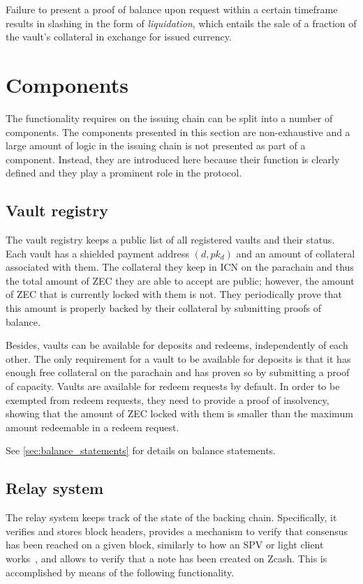 Failure to present a proof of balance upon request within a certain timeframe results in slashing in the form of \emph{liquidation}, which entails the sale of a fraction of the vault's collateral in exchange for issued currency.


\section{Components}

The functionality \zclaim requires on the issuing chain can be split into a number of components.
The components presented in this section are non-exhaustive and a large amount of logic in the issuing chain is not presented as part of a component.
Instead, they are introduced here because their function is clearly defined and they play a prominent role in the protocol.

\subsection{Vault registry}

The vault registry keeps a public list of all registered vaults and their status.
Each vault has a shielded payment address $(d, pk_d)$ and an amount of collateral associated with them.
The collateral they keep in ICN on the parachain and thus the total amount of ZEC they are able to accept are public; however, the amount of ZEC that is currently locked with them is not.
They periodically prove that this amount is properly backed by their collateral by submitting proofs of balance.

Besides, vaults can be available for deposits and redeems, independently of each other.
The only requirement for a vault to be available for deposits is that it has enough free collateral on the parachain and has proven so by submitting a proof of capacity.
Vaults are available for redeem requests by default.
In order to be exempted from redeem requests, they need to provide a proof of insolvency, showing that the amount of ZEC locked with them is smaller than the maximum amount redeemable in a redeem request.

See \cref{sec:balance_statements} for details on balance statements.

\subsection{Relay system}
The relay system keeps track of the state of the backing chain.
Specifically, it verifies and stores block headers, provides a mechanism to verify that consensus has been reached on a given block, similarly to how an SPV or light client works~\cite{SPVBitcoinWiki,GithubBtcRelay,Back2014sidechains}, and allows to verify that a note has been created on Zcash.
This is accomplished by means of the following functionality.

